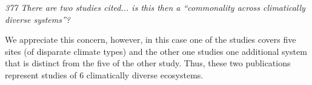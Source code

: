 \documentclass[11pt,a4paper]{letter}
\begin{document}
\begin{letter}{}
\emph{377 There are two studies cited... is this then a ``commonality across climatically diverse systems''?}

We appreciate this concern, however, in this case one of the studies covers five sites (of disparate climate types) and the other one studies one additional system that is distinct from the five of the other study. Thus, these two publications represent studies of 6 climatically diverse ecosystems.

\newpage


\end{letter}
\end{document}
